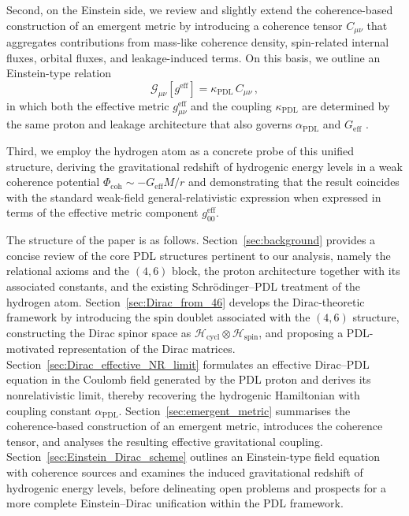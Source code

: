 \documentclass[11pt,a4paper]{article}
\theoremstyle{definition}
\newcommand{\PDL}{\mathrm{PDL}}
\newcommand{\Hspin}{\mathcal{H}_{\mathrm{spin}}}
\newcommand{\Hcycl}{\mathcal{H}_{\mathrm{cycl}}}
\newcommand{\Geff}{G_{\mathrm{eff}}}
\newcommand{\alphaPDL}{\alpha_{\mathrm{PDL}}}
\newcommand{\Ccoh}{C_{\mu\nu}} %
\begin{document}
Second, on the Einstein side, we review and slightly extend the coherence-based construction of an emergent metric by introducing a coherence tensor $\Ccoh$ that aggregates contributions from mass-like coherence density, spin-related internal fluxes, orbital fluxes, and leakage-induced terms. On this basis, we outline an Einstein-type relation
\[
\mathcal{G}_{\mu\nu}[g^{\mathrm{eff}}] = \kappa_{\PDL}\,\Ccoh \,,
\]
in which both the effective metric $g^{\mathrm{eff}}_{\mu\nu}$ and the coupling $\kappa_{\PDL}$ are determined by the same proton and leakage architecture that also governs $\alphaPDL$ and $\Geff$ \cite{PDL,PDL_Global_Mapping_Structures_Results_Open_Problems,A_Topological_Reformulation_in_the_Projective_Dynamic_Logo_Framework_Hierarchical_Coherence_Filtering_and_the_Exponent_18_in_PDL}. 

Third, we employ the hydrogen atom as a concrete probe of this unified structure, deriving the gravitational redshift of hydrogenic energy levels in a weak coherence potential $\Phi_{\mathrm{coh}} \sim -\Geff M/r$ and demonstrating that the result coincides with the standard weak-field general-relativistic expression when expressed in terms of the effective metric component $g^{\mathrm{eff}}_{00}$.

The structure of the paper is as follows. Section~\ref{sec:background} provides a concise review of the core PDL structures pertinent to our analysis, namely the relational axioms and the $(4,6)$ block, the proton architecture together with its associated constants, and the existing Schr\"odinger--PDL treatment of the hydrogen atom. Section~\ref{sec:Dirac_from_46} develops the Dirac-theoretic framework by introducing the spin doublet associated with the $(4,6)$ structure, constructing the Dirac spinor space as $\Hcycl \otimes \Hspin$, and proposing a PDL-motivated representation of the Dirac matrices. Section~\ref{sec:Dirac_effective_NR_limit} formulates an effective Dirac--PDL equation in the Coulomb field generated by the PDL proton and derives its nonrelativistic limit, thereby recovering the hydrogenic Hamiltonian with coupling constant $\alphaPDL$. Section~\ref{sec:emergent_metric} summarises the coherence-based construction of an emergent metric, introduces the coherence tensor, and analyses the resulting effective gravitational coupling. Section~\ref{sec:Einstein_Dirac_scheme} outlines an Einstein-type field equation with coherence sources and examines the induced gravitational redshift of hydrogenic energy levels, before delineating open problems and prospects for a more complete Einstein--Dirac unification within the PDL framework.
\end{document}
